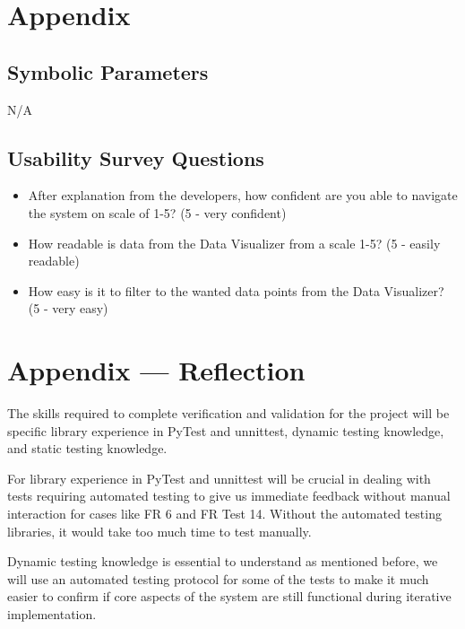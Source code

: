\documentclass[12pt, titlepage]{article}
\begin{document}


				





\section{Appendix}

\subsection{Symbolic Parameters}
N/A

\subsection{Usability Survey Questions}

\begin{itemize}
    \item After explanation from the developers, how confident are you able to navigate the system on scale of 1-5? (5 - very confident)
    \item How readable is data from the Data Visualizer from a scale 1-5? (5 - easily readable)
    \item How easy is it to filter to the wanted data points from the Data Visualizer? (5 - very easy)
\end{itemize}

\newpage{}
\section*{Appendix --- Reflection}

The skills required to complete verification and validation for the project will be specific library experience in PyTest and unnittest, dynamic testing knowledge, and static testing knowledge.

For library experience in PyTest and unnittest will be crucial in dealing with tests requiring automated testing to give us immediate feedback without manual interaction for cases like FR 6 and FR Test 14. Without the automated testing libraries, it would take too much time to test manually. 

Dynamic testing knowledge is essential to understand as mentioned before, we will use an automated testing protocol for some of the tests to make it much easier to confirm if core aspects of the system are still functional during iterative implementation.
\end{document}
